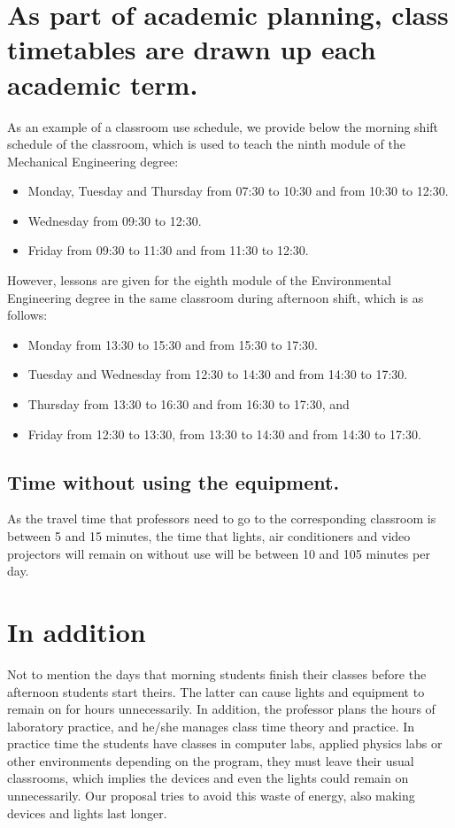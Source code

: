 \documentclass[]{scrartcl}
\begin{document}
\section*{As part of academic planning, class timetables are drawn up each academic term.}
	As an example of a classroom use schedule, we provide below the morning shift schedule of the classroom, which is used to teach the ninth module of the Mechanical Engineering degree:
	\begin{itemize}
		\item Monday, Tuesday and Thursday from 07:30 to 10:30 and from 10:30 to 12:30.
		\item Wednesday from 09:30 to 12:30.
		\item Friday from 09:30 to 11:30 and from 11:30 to 12:30.
	\end{itemize}
	However, lessons are given for the eighth module of the Environmental Engineering degree in the same classroom during afternoon shift, which is as follows:
	\begin{itemize}
		\item Monday from 13:30 to 15:30 and from 15:30 to 17:30.
		\item Tuesday and Wednesday from 12:30 to 14:30 and from 14:30 to 17:30.
		\item Thursday from 13:30 to 16:30 and from 16:30 to 17:30, and
		\item Friday from 12:30 to 13:30, from 13:30 to 14:30 and from 14:30 to 17:30.
	\end{itemize}
	\subsection*{Time without using the equipment.}
	As the travel time that professors need to go to the corresponding classroom is between 5 and 15 minutes, the time that lights, air conditioners and video projectors will remain on without use will be between 10 and 105 minutes per day.
\section*{In addition}
	Not to mention the days that morning students finish their classes before the afternoon students start theirs. The latter can cause lights and equipment to remain on for hours unnecessarily. In addition, the professor plans the hours of laboratory practice, and he/she manages class time theory and practice. In practice time the students have classes in computer labs, applied physics labs or other environments depending on the program, they must leave their usual classrooms, which implies the devices and even the lights could remain on unnecessarily. Our proposal tries to avoid this waste of energy, also making devices and lights last longer.
\end{document}
